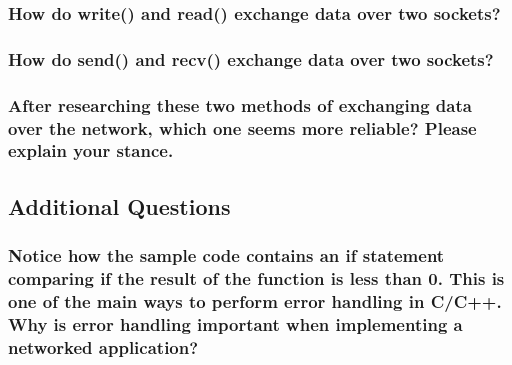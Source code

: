 \documentclass{article}
\begin{document}
	\subsubsection{How do write() and read() exchange data over two sockets?}
	\vspace{108pt}
	
	\subsubsection{How do send() and recv() exchange data over two sockets?}
	\vspace{108pt}
	
	\subsubsection{After researching these two methods of exchanging data over the network, which one seems more reliable? Please explain your stance.}
	\pagebreak{}
	
	\begin{Large}
		\subsection{\textbf{Additional Questions}}
	\end{Large}
	
	\subsubsection{Notice how the sample code contains an if statement comparing if the result of the function is less than 0. This is one of the main ways to perform error handling in C/C++. Why is error handling important when implementing a networked application?}
	\vspace{108pt}
	
	
\end{document}
